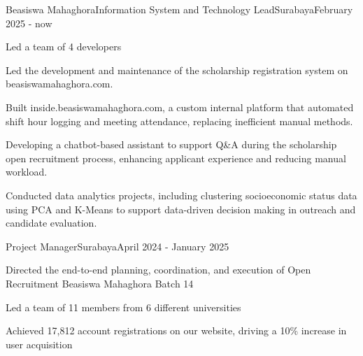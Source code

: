 \begin{resume_employer}{Beasiswa Mahaghora}{Information System and Technology Lead}{Surabaya}{February 2025 - now}
  \item Led a team of 4 developers 
  \item Led the development and maintenance of the scholarship registration system on beasiswamahaghora.com.
  \item Built inside.beasiswamahaghora.com, a custom internal platform that automated shift hour logging and meeting attendance, replacing inefficient manual methods.
  \item Developing a chatbot-based assistant to support Q\&A during the scholarship open recruitment process, enhancing applicant experience and reducing manual workload.
  \item Conducted data analytics projects, including clustering socioeconomic status data using PCA and K-Means to support data-driven decision making in outreach and candidate evaluation.
\end{resume_employer}

\renewcommand{\secsep}{0pt}
\begin{resume_employer}{}{Project Manager}{Surabaya}{April 2024 - January 2025}
  \item Directed the end-to-end planning, coordination, and execution of Open Recruitment Beasiswa Mahaghora Batch 14
  \item Led a team of 11 members from 6 different universities
  \item Achieved 17,812 account registrations on our website, driving a 10\% increase in user acquisition
\end{resume_employer}
\renewcommand{\secsep}{0.1cm} %